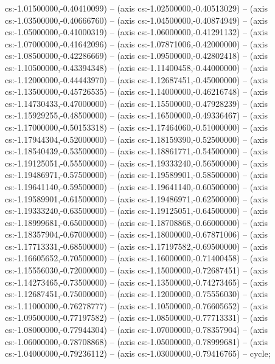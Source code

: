 cs:-1.01500000,-0.40410099) -- (axis cs:-1.02500000,-0.40513029) -- (axis cs:-1.03500000,-0.40666760) -- (axis cs:-1.04500000,-0.40874949) -- (axis cs:-1.05000000,-0.41000319) -- (axis cs:-1.06000000,-0.41291132) -- (axis cs:-1.07000000,-0.41642096) -- (axis cs:-1.07871006,-0.42000000) -- (axis cs:-1.08500000,-0.42286669) -- (axis cs:-1.09500000,-0.42802418) -- (axis cs:-1.10500000,-0.43394348) -- (axis cs:-1.11400458,-0.44000000) -- (axis cs:-1.12000000,-0.44443970) -- (axis cs:-1.12687451,-0.45000000) -- (axis cs:-1.13500000,-0.45726535) -- (axis cs:-1.14000000,-0.46216748) -- (axis cs:-1.14730433,-0.47000000) -- (axis cs:-1.15500000,-0.47928239) -- (axis cs:-1.15929255,-0.48500000) -- (axis cs:-1.16500000,-0.49336467) -- (axis cs:-1.17000000,-0.50153318) -- (axis cs:-1.17464060,-0.51000000) -- (axis cs:-1.17944304,-0.52000000) -- (axis cs:-1.18159390,-0.52500000) -- (axis cs:-1.18540439,-0.53500000) -- (axis cs:-1.18861771,-0.54500000) -- (axis cs:-1.19125051,-0.55500000) -- (axis cs:-1.19333240,-0.56500000) -- (axis cs:-1.19486971,-0.57500000) -- (axis cs:-1.19589901,-0.58500000) -- (axis cs:-1.19641140,-0.59500000) -- (axis cs:-1.19641140,-0.60500000) -- (axis cs:-1.19589901,-0.61500000) -- (axis cs:-1.19486971,-0.62500000) -- (axis cs:-1.19333240,-0.63500000) -- (axis cs:-1.19125051,-0.64500000) -- (axis cs:-1.18999681,-0.65000000) -- (axis cs:-1.18708868,-0.66000000) -- (axis cs:-1.18357904,-0.67000000) -- (axis cs:-1.18000000,-0.67871006) -- (axis cs:-1.17713331,-0.68500000) -- (axis cs:-1.17197582,-0.69500000) -- (axis cs:-1.16605652,-0.70500000) -- (axis cs:-1.16000000,-0.71400458) -- (axis cs:-1.15556030,-0.72000000) -- (axis cs:-1.15000000,-0.72687451) -- (axis cs:-1.14273465,-0.73500000) -- (axis cs:-1.13500000,-0.74273465) -- (axis cs:-1.12687451,-0.75000000) -- (axis cs:-1.12000000,-0.75556030) -- (axis cs:-1.11000000,-0.76278777) -- (axis cs:-1.10500000,-0.76605652) -- (axis cs:-1.09500000,-0.77197582) -- (axis cs:-1.08500000,-0.77713331) -- (axis cs:-1.08000000,-0.77944304) -- (axis cs:-1.07000000,-0.78357904) -- (axis cs:-1.06000000,-0.78708868) -- (axis cs:-1.05000000,-0.78999681) -- (axis cs:-1.04000000,-0.79236112) -- (axis cs:-1.03000000,-0.79416765) -- cycle;
